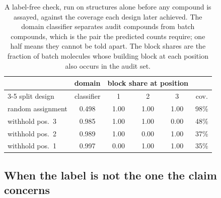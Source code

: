 \documentclass[twocolumn,10pt]{article}
\begin{document}
\begin{table}[t]
\centering
\caption{A label-free check, run on structures alone before any compound is assayed, against the coverage each design later achieved. The domain classifier separates audit compounds from batch compounds, which is the pair the predicted counts require; one half means they cannot be told apart. The block shares are the fraction of batch molecules whose building block at each position also occurs in the audit set.}
\label{tab:preflight}
\small
\setlength{\tabcolsep}{4pt}
\begin{tabular}{lccccc}
\toprule
 & domain & \multicolumn{3}{c}{block share at position} & \\
\cmidrule(lr){3-5}
split design & classifier & 1 & 2 & 3 & cov. \\
\midrule
random assignment & 0.498 & 1.00 & 1.00 & 1.00 & 98\% \\
withhold pos.\ 3 & 0.985 & 1.00 & 1.00 & 0.00 & 48\% \\
withhold pos.\ 2 & 0.989 & 1.00 & 0.00 & 1.00 & 37\% \\
withhold pos.\ 1 & 0.997 & 0.00 & 1.00 & 1.00 & 35\% \\
\bottomrule
\end{tabular}
\end{table}

\subsection{When the label is not the one the claim concerns}
\label{sec:results:surrogate}
\end{document}
